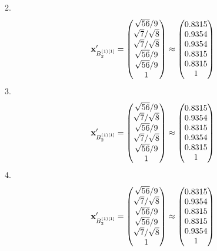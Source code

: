 \documentclass[10pt,a4paper]{article}
\begin{document}
	2.
	\[
		\bold{x}'_{B_2^{(1)[1]}} = 
		\begin{pmatrix}
			{\sqrt{56}} / {{9}} \\
			{\sqrt{7}} / {\sqrt{8}} \\
			{\sqrt{7}} / {\sqrt{8}} \\
			{\sqrt{56}} / {{9}} \\
			{\sqrt{56}} / {{9}} \\
			{1}{} \\
		\end{pmatrix}
		\approx
		\begin{pmatrix}
			0.8315   \\
			0.9354   \\
			0.9354   \\
			0.8315   \\
			0.8315   \\
			1        \\
		\end{pmatrix}
	\]
	3.
	\[
		\bold{x}'_{B_2^{(1)[1]}} = 
		\begin{pmatrix}
			{\sqrt{56}} / {{9}} \\
			{\sqrt{7}} / {\sqrt{8}} \\
			{\sqrt{56}} / {{9}} \\
			{\sqrt{7}} / {\sqrt{8}} \\
			{\sqrt{56}} / {{9}} \\
			{1}{} \\
		\end{pmatrix}
		\approx
		\begin{pmatrix}
			0.8315   \\
			0.9354   \\
			0.8315   \\
			0.9354   \\
			0.8315   \\
			1        \\
		\end{pmatrix}
	\]
	4.
	\[
		\bold{x}'_{B_2^{(1)[1]}} = 
		\begin{pmatrix}
			{\sqrt{56}} / {{9}} \\
			{\sqrt{7}} / {\sqrt{8}} \\
			{\sqrt{56}} / {{9}} \\
			{\sqrt{56}} / {{9}} \\
			{\sqrt{7}} / {\sqrt{8}} \\
			{1}{} \\
		\end{pmatrix}
		\approx
		\begin{pmatrix}
			0.8315   \\
			0.9354   \\
			0.8315   \\
			0.8315   \\
			0.9354   \\
			1        \\
		\end{pmatrix}
	\]
\end{document}
